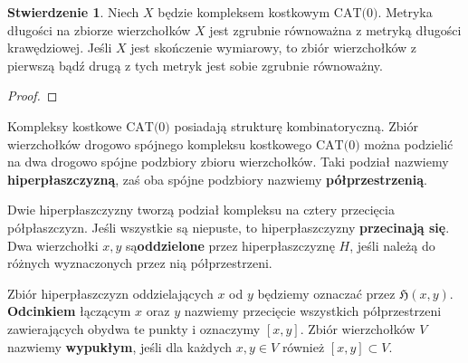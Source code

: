 \documentclass[licencjacka]{pracamgr}
\theoremstyle{definition}
\theoremstyle{definition}
\theoremstyle{definition}
\newtheorem{proposition}{Stwierdzenie}[section]
\theoremstyle{definition}
\theoremstyle{definition}
\theoremstyle{plain}
\theoremstyle{plain}
\begin{document}
\begin{proposition}
	Niech $ X $ będzie kompleksem kostkowym $ \text{CAT(0)}$. Metryka długości na 
	zbiorze wierzchołków $ X $ jest zgrubnie równoważna z metryką długości krawędziowej.
	Jeśli $ X $ jest skończenie wymiarowy, to zbiór wierzchołków z pierwszą bądź drugą z 
	tych metryk jest sobie zgrubnie równoważny.
\end{proposition}
\begin{proof}

\end{proof}

Kompleksy kostkowe $ \text{CAT(0)} $ posiadają strukturę kombinatoryczną. Zbiór 
wierzchołków drogowo spójnego kompleksu kostkowego $ \text{CAT(0)} $ można podzielić na dwa 
drogowo spójne podzbiory zbioru wierzchołków. Taki podział nazwiemy 
\textbf{hiperpłaszczyzną}, zaś oba 
spójne podzbiory nazwiemy \textbf{półprzestrzenią}. 

%
%

Dwie hiperpłaszczyzny tworzą podział kompleksu na cztery przecięcia półpłaszczyzn. Jeśli 
wszystkie są niepuste, to hiperpłaszczyzny \textbf{przecinają się}. Dwa wierzchołki 
$ x,y $ są\textbf{oddzielone} przez hiperpłaszczyznę $ H $, jeśli należą do różnych 
wyznaczonych przez nią półprzestrzeni. 

Zbiór hiperpłaszczyzn oddzielających $ x $ od $ y $ będziemy oznaczać przez 
$\mathfrak{H}(x,y)$. \textbf{Odcinkiem} łączącym $ x $ oraz $ y $ nazwiemy przecięcie 
wszystkich półprzestrzeni zawierających obydwa te punkty i oznaczymy $ [x,y]$. Zbiór 
wierzchołków $ V $ nazwiemy \textbf{wypukłym}, jeśli dla każdych $ x,y \in V $ również 
$ [x,y] \subset V $.
\end{document}
